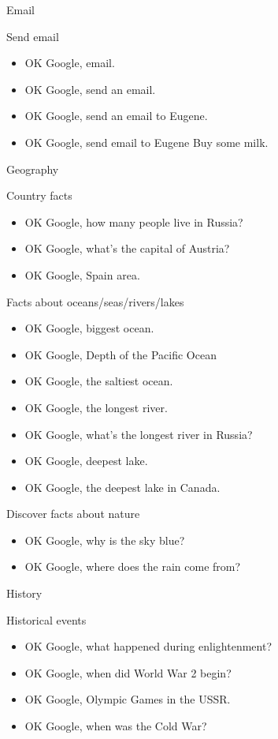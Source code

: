 \documentclass[
  letterpaper,
  DIV=11,
  numbers=noendperiod]{scrartcl}
\begin{document}
Email

Send email

\begin{itemize}
\item
  OK Google, email.
\item
  OK Google, send an email.
\item
  OK Google, send an email to Eugene.
\item
  OK Google, send email to Eugene Buy some milk.
\end{itemize}

Geography

Country facts

\begin{itemize}
\item
  OK Google, how many people live in Russia?
\item
  OK Google, what's the capital of Austria?
\item
  OK Google, Spain area.
\end{itemize}

Facts about oceans/seas/rivers/lakes

\begin{itemize}
\item
  OK Google, biggest ocean.
\item
  OK Google, Depth of the Pacific Ocean
\item
  OK Google, the saltiest ocean.
\item
  OK Google, the longest river.
\item
  OK Google, what's the longest river in Russia?
\item
  OK Google, deepest lake.
\item
  OK Google, the deepest lake in Canada.
\end{itemize}

Discover facts about nature

\begin{itemize}
\item
  OK Google, why is the sky blue?
\item
  OK Google, where does the rain come from?
\end{itemize}

History

Historical events

\begin{itemize}
\item
  OK Google, what happened during enlightenment?
\item
  OK Google, when did World War 2 begin?
\item
  OK Google, Olympic Games in the USSR.
\item
  OK Google, when was the Cold War?
\end{itemize}
\end{document}
